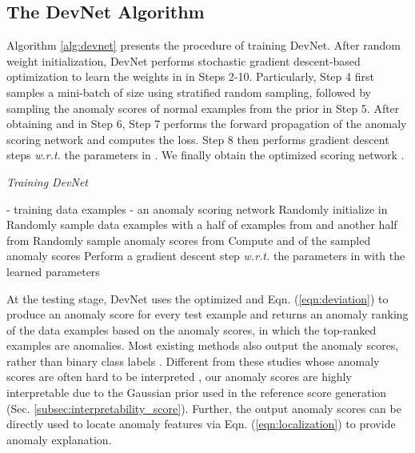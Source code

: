 \documentclass[10pt,journal,compsoc]{IEEEtran}
\begin{document}
\subsection{The DevNet Algorithm}\label{subsec:algo}

Algorithm \ref{alg:devnet} presents the procedure of training DevNet. After random weight initialization, DevNet performs stochastic gradient descent-based optimization to learn the weights in  in Steps 2-10. Particularly, Step 4 first samples a mini-batch  of size  using stratified random sampling, followed by sampling the anomaly scores of  normal examples from the prior  in Step 5. After obtaining  and  in Step 6, Step 7 performs the forward propagation of the anomaly scoring network and computes the loss. Step 8 then performs gradient descent steps \textit{w.r.t.} the parameters in . We finally obtain the optimized scoring network .

\renewcommand{\algorithmicrequire}{\textbf{Input:}}
\renewcommand{\algorithmicensure}{\textbf{Output:}}
\begin{algorithm}[t]
\small 
\caption{\textit{Training DevNet}}
\begin{algorithmic}[1]
\label{alg:devnet}
\REQUIRE  - training data examples
\ENSURE  - an anomaly scoring network
\STATE Randomly initialize  in 
        \STATE  Randomly sample  data examples with a half of examples from  and another half from 
        \STATE Randomly sample  anomaly scores from 
        \STATE Compute  and  of the  sampled anomaly scores
\STATE     
        \STATE Perform a gradient descent step \textit{w.r.t.} the parameters in 
    \ENDFOR
\ENDFOR
\RETURN  with the learned parameters 
\end{algorithmic}
\end{algorithm}


At the testing stage, DevNet uses the optimized  and Eqn. (\ref{eqn:deviation}) to produce an anomaly score for every test example and returns an anomaly ranking of the data examples based on the anomaly scores, in which the top-ranked examples are anomalies. Most existing methods also output the anomaly scores, rather than binary class labels \cite{chandola2009anomaly,pang2021deep}. Different from these studies whose anomaly scores are often hard to be interpreted \cite{kriegel2011interpreting}, our anomaly scores are highly interpretable due to the Gaussian prior used in the reference score generation (Sec. \ref{subsec:interpretability_score}). Further, the output anomaly scores can be directly used to locate anomaly features via Eqn. (\ref{eqn:localization}) to provide anomaly explanation.
\end{document}
